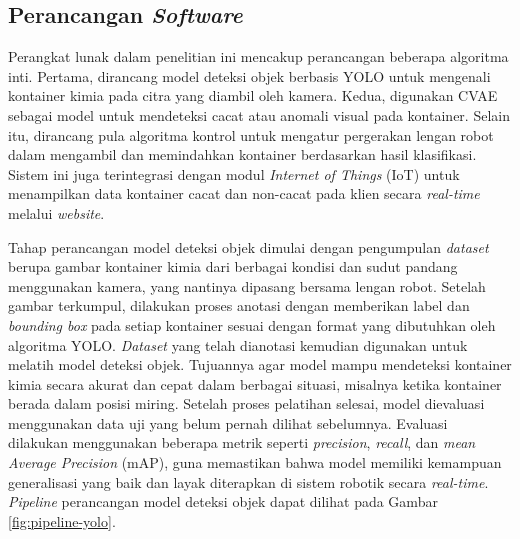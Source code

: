 \vspace{1em}

\subsection{Perancangan \textit{Software}}
Perangkat lunak dalam penelitian ini mencakup perancangan beberapa
algoritma inti. Pertama, dirancang model deteksi objek berbasis YOLO
untuk mengenali kontainer kimia pada citra yang diambil oleh kamera.
Kedua, digunakan CVAE sebagai model untuk
mendeteksi cacat atau anomali visual pada kontainer. Selain itu,
dirancang pula algoritma kontrol untuk mengatur pergerakan lengan
robot dalam mengambil dan memindahkan kontainer berdasarkan hasil
klasifikasi. Sistem ini juga terintegrasi dengan modul
\textit{Internet of Things} (IoT) untuk menampilkan data kontainer
cacat dan non-cacat
pada klien secara \textit{real-time} melalui \textit{website}. \par

Tahap perancangan model deteksi objek dimulai dengan pengumpulan
\textit{dataset} berupa gambar kontainer kimia dari berbagai kondisi dan sudut
pandang menggunakan kamera, yang nantinya dipasang bersama lengan
robot. Setelah gambar terkumpul, dilakukan proses anotasi dengan
memberikan label dan \textit{bounding box} pada setiap kontainer sesuai dengan
format yang dibutuhkan oleh algoritma YOLO. \textit{Dataset} yang telah
dianotasi kemudian digunakan untuk melatih model deteksi objek.
Tujuannya agar model mampu mendeteksi kontainer kimia secara akurat
dan cepat dalam berbagai situasi, misalnya ketika kontainer berada
dalam posisi miring. Setelah proses pelatihan selesai, model
dievaluasi menggunakan data uji yang belum pernah dilihat sebelumnya.
Evaluasi dilakukan menggunakan beberapa metrik seperti \textit{precision},
\textit{recall}, dan \textit{mean Average Precision} (mAP), guna
memastikan bahwa model
memiliki kemampuan generalisasi yang baik dan layak diterapkan di
sistem robotik secara \textit{real-time}. \textit{Pipeline}
perancangan model deteksi
objek dapat dilihat pada Gambar \ref{fig:pipeline-yolo}.


